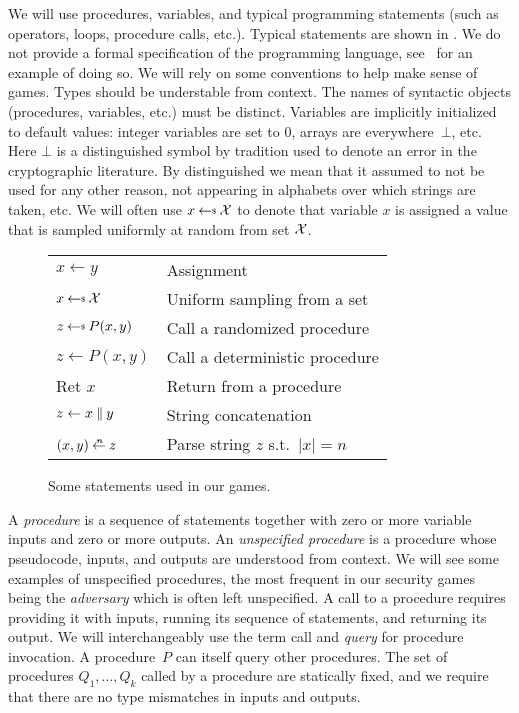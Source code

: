 We will use procedures, variables, and typical
programming statements (such as operators, loops, procedure calls, etc.).
Typical statements are shown in .
We do not provide a formal specification of the programming language,
see~\cite[Appendix B]{bellare2006security} for an example of doing so. 
We will rely on some conventions to help make sense of games.
Types should be understable
from context. The names of syntactic objects (procedures, variables, etc.)
must be distinct.  Variables are implicitly 
initialized to default values:  integer variables are set
to 0, arrays are everywhere~$\bot$, etc. Here $\bot$ is a distinguished symbol
by tradition used to denote an error in the cryptographic literature.
By distinguished we mean that it assumed to not be used for any other reason,
not appearing in alphabets over which strings are taken, etc. We will often use $x \getsr \calX$ to denote that variable $x$ is assigned a value that is sampled uniformly at random from set ${\cal X}$. 


\begin{wrapfigure}{r}{3in}
\gamesfontsize
\begin{tabular}{lp{2in}}
\toprule
$x \gets y$ & Assignment\\
$x \getsr \calX$ & Uniform sampling from a set\\
$z \getsr P(x,y)$ & Call a randomized procedure\\
$z \gets P(x,y)$ & Call a deterministic procedure\\
Ret $x$ & Return from a procedure\\
$z \gets x \: \| \: y$ & String concatenation\\
$(x,y) \getparse{n} z$ & Parse string $z$ s.t.~$|x| = n$\\
\bottomrule
\end{tabular}
\caption{Some statements used in our games.}
\label{fig:statements}
\end{wrapfigure}


A \textit{procedure} is a sequence of statements together 
with zero or more variable inputs and zero or more 
outputs. %
An \emph{unspecified procedure} is a procedure whose pseudocode, inputs, and
outputs are understood from context.  We will see some examples of
unspecified procedures, the most frequent in our security games being the 
\emph{adversary} which is often left unspecified. 
%
%
A call to a procedure requires providing it with inputs, running its sequence of
statements, and returning its output. We will interchangeably use the term call
and \emph{query} for procedure invocation.
A procedure~$P$ can itself query other
procedures. The set of procedures $Q_1,\ldots,Q_k$ called by a procedure are
statically fixed, and we require that there are no type mismatches in inputs and
outputs. 

